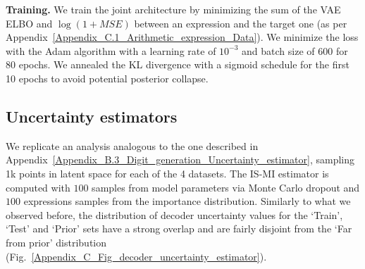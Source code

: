 \begin{table}[h]
\begin{center}
\caption{\textbf{Arithmetic expressions approximation - Model architecture details}}
\label{Appendix_C_Table_model}
\end{center}
\end{table}

\textbf{Training.} We train the joint architecture by minimizing the sum of the VAE ELBO and $\log(1+MSE)$ between an expression and the target one (as per Appendix~\ref{Appendix_C.1_Arithmetic_expression_Data}).
We minimize the loss with the Adam algorithm \citep{kingma2017adam} with a learning rate of $10^{-3}$ and batch size of $600$ for 80 epochs. We annealed the KL divergence with a sigmoid schedule for the first 10 epochs to avoid potential posterior collapse.

\subsection{Uncertainty estimators}
\label{Appendix_C.3_Arithmetic_expression_Uncertainty_estimator}

We replicate an analysis analogous to the one described in Appendix~\ref{Appendix_B.3_Digit_generation_Uncertainty_estimator}, sampling 1k points in latent space for each of the 4 datasets. The IS-MI estimator is computed with $100$ samples from model parameters via Monte Carlo dropout and $100$ expressions samples from the importance distribution. Similarly to what we observed before, the distribution of decoder uncertainty values for the `Train', `Test' and `Prior' sets have a strong overlap and are fairly disjoint from the `Far from prior' distribution (Fig.~\ref{Appendix_C_Fig_decoder_uncertainty_estimator}).

